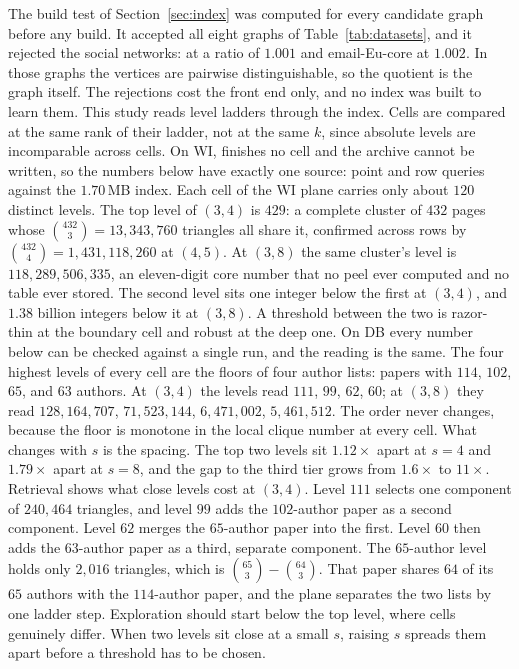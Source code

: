 The build test of Section~\ref{sec:index} was computed for every candidate graph before any build.
%
It accepted all eight graphs of Table~\ref{tab:datasets}, and it rejected the social networks: \pokec{} at a ratio of $1.001$ and \textsf{email-Eu-core} at $1.002$.
%
In those graphs the vertices are pairwise distinguishable, so the quotient is the graph itself.
%
The rejections cost the front end only, and no index was built to learn them.
This study reads level ladders through the index.
%
Cells are compared at the same rank of their ladder, not at the same $k$, since absolute levels are incomparable across cells.
%
On WI, \cnd{} finishes no cell and the archive cannot be written, so the numbers below have exactly one source: point and row queries against the $1.70$\,MB index.
%
Each cell of the WI plane carries only about $120$ distinct levels.
%
The top level of $(3,4)$ is $429$: a complete cluster of $432$ pages whose $\binom{432}{3}=13{,}343{,}760$ triangles all share it, confirmed across rows by $\binom{432}{4}=1{,}431{,}118{,}260$ at $(4,5)$.
%
At $(3,8)$ the same cluster's level is $118{,}289{,}506{,}335$, an eleven-digit core number that no peel ever computed and no table ever stored.
%
The second level sits one integer below the first at $(3,4)$, and $1.38$ billion integers below it at $(3,8)$.
%
A threshold between the two is razor-thin at the boundary cell and robust at the deep one.
%
On DB every number below can be checked against a single \cnd{} run, and the reading is the same.
%
The four highest levels of every cell are the floors of four author lists: papers with $114$, $102$, $65$, and $63$ authors.
%
At $(3,4)$ the levels read $111$, $99$, $62$, $60$; at $(3,8)$ they read $128{,}164{,}707$, $71{,}523{,}144$, $6{,}471{,}002$, $5{,}461{,}512$.
%
The order never changes, because the floor is monotone in the local clique number at every cell.
%
What changes with $s$ is the spacing.
%
The top two levels sit $1.12\times$ apart at $s=4$ and $1.79\times$ apart at $s=8$, and the gap to the third tier grows from $1.6\times$ to $11\times$.
%
Retrieval shows what close levels cost at $(3,4)$.
%
Level $111$ selects one component of $240{,}464$ triangles, and level $99$ adds the $102$-author paper as a second component.
%
Level $62$ merges the $65$-author paper into the first.
%
Level $60$ then adds the $63$-author paper as a third, separate component.
%
The $65$-author level holds only $2{,}016$ triangles, which is $\binom{65}{3}-\binom{64}{3}$.
%
That paper shares $64$ of its $65$ authors with the $114$-author paper, and the plane separates the two lists by one ladder step.
%
Exploration should start below the top level, where cells genuinely differ.
%
When two levels sit close at a small $s$, raising $s$ spreads them apart before a threshold has to be chosen.

